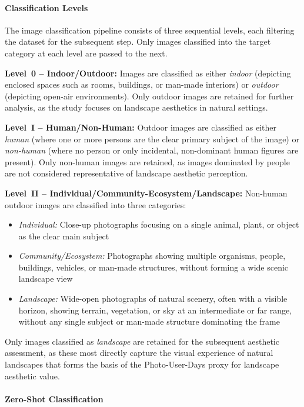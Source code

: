 \documentclass[hidelinks, 11pt]{article}
\begin{document}
\paragraph{Classification Levels}

The image classification pipeline consists of three sequential levels, each filtering the dataset for the subsequent step. Only images classified into the target category at each level are passed to the next.

\textbf{Level~0 -- Indoor/Outdoor:} Images are classified as either 
\textit{indoor} (depicting enclosed spaces such as rooms, buildings, or man-made interiors) or \textit{outdoor} (depicting open-air environments). Only outdoor images are retained for further analysis, as the study focuses on landscape aesthetics in natural settings.

\textbf{Level~I -- Human/Non-Human:} Outdoor images are classified as either 
\textit{human} (where one or more persons are the clear primary subject of the 
image) or \textit{non-human} (where no person or only incidental, non-dominant human figures are present). Only non-human images are retained, as images dominated by people are not considered representative of landscape aesthetic perception.

\textbf{Level~II -- Individual/Community-Ecosystem/Landscape:} Non-human outdoor images are classified into three categories:
\begin{itemize}
    \item \textit{Individual:} Close-up photographs focusing on a single 
    animal, plant, or object as the clear main subject
    \item \textit{Community/Ecosystem:} Photographs showing multiple 
    organisms, people, buildings, vehicles, or man-made structures, without 
    forming a wide scenic landscape view
    \item \textit{Landscape:} Wide-open photographs of natural scenery, 
    often with a visible horizon, showing terrain, vegetation, or sky at an 
    intermediate or far range, without any single subject or man-made structure 
    dominating the frame
\end{itemize}

Only images classified as \textit{landscape} are retained for the subsequent aesthetic assessment, as these most directly capture the visual experience of natural landscapes that forms the basis of the Photo-User-Days proxy for landscape aesthetic value.


\paragraph{Zero-Shot Classification}
\end{document}
